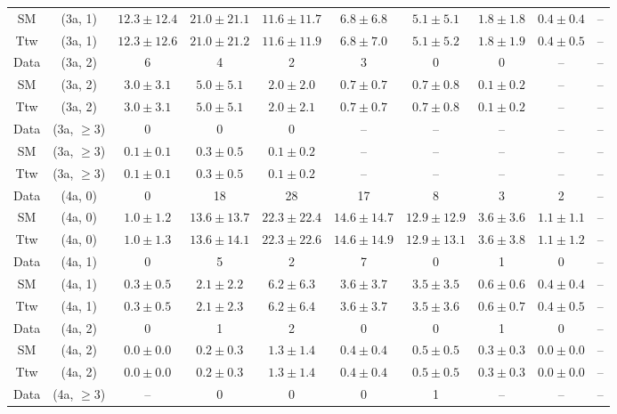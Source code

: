 \begin{table}[h!]
{\begin{tabular}{cccccccccc}
	SM & (3a, 1) & $12.3\pm 12.4$ & $21.0\pm 21.1$ & $11.6\pm 11.7$ & $6.8\pm 6.8$ & $5.1\pm 5.1$ & $1.8\pm 1.8$ & $0.4\pm 0.4$ & -- \\[0.5ex] 
	Ttw & (3a, 1) & $12.3\pm 12.6$ & $21.0\pm 21.2$ & $11.6\pm 11.9$ & $6.8\pm 7.0$ & $5.1\pm 5.2$ & $1.8\pm 1.9$ & $0.4\pm 0.5$ & -- \\[0.5ex] 
	Data & (3a, 2) & 6 & 4 & 2 & 3 & 0 & 0 & -- & -- \\[0.5ex] 
	SM & (3a, 2) & $3.0\pm 3.1$ & $5.0\pm 5.1$ & $2.0\pm 2.0$ & $0.7\pm 0.7$ & $0.7\pm 0.8$ & $0.1\pm 0.2$ & -- & -- \\[0.5ex] 
	Ttw & (3a, 2) & $3.0\pm 3.1$ & $5.0\pm 5.1$ & $2.0\pm 2.1$ & $0.7\pm 0.7$ & $0.7\pm 0.8$ & $0.1\pm 0.2$ & -- & -- \\[0.5ex] 
	Data & (3a, $\ge3$) & 0 & 0 & 0 & -- & -- & -- & -- & -- \\[0.5ex] 
	SM & (3a, $\ge3$) & $0.1\pm 0.1$ & $0.3\pm 0.5$ & $0.1\pm 0.2$ & -- & -- & -- & -- & -- \\[0.5ex] 
	Ttw & (3a, $\ge3$) & $0.1\pm 0.1$ & $0.3\pm 0.5$ & $0.1\pm 0.2$ & -- & -- & -- & -- & -- \\[0.5ex] 
	Data & (4a, 0) & 0 & 18 & 28 & 17 & 8 & 3 & 2 & -- \\[0.5ex] 
	SM & (4a, 0) & $1.0\pm 1.2$ & $13.6\pm 13.7$ & $22.3\pm 22.4$ & $14.6\pm 14.7$ & $12.9\pm 12.9$ & $3.6\pm 3.6$ & $1.1\pm 1.1$ & -- \\[0.5ex] 
	Ttw & (4a, 0) & $1.0\pm 1.3$ & $13.6\pm 14.1$ & $22.3\pm 22.6$ & $14.6\pm 14.9$ & $12.9\pm 13.1$ & $3.6\pm 3.8$ & $1.1\pm 1.2$ & -- \\[0.5ex] 
	Data & (4a, 1) & 0 & 5 & 2 & 7 & 0 & 1 & 0 & -- \\[0.5ex] 
	SM & (4a, 1) & $0.3\pm 0.5$ & $2.1\pm 2.2$ & $6.2\pm 6.3$ & $3.6\pm 3.7$ & $3.5\pm 3.5$ & $0.6\pm 0.6$ & $0.4\pm 0.4$ & -- \\[0.5ex] 
	Ttw & (4a, 1) & $0.3\pm 0.5$ & $2.1\pm 2.3$ & $6.2\pm 6.4$ & $3.6\pm 3.7$ & $3.5\pm 3.6$ & $0.6\pm 0.7$ & $0.4\pm 0.5$ & -- \\[0.5ex] 
	Data & (4a, 2) & 0 & 1 & 2 & 0 & 0 & 1 & 0 & -- \\[0.5ex] 
	SM & (4a, 2) & $0.0\pm 0.0$ & $0.2\pm 0.3$ & $1.3\pm 1.4$ & $0.4\pm 0.4$ & $0.5\pm 0.5$ & $0.3\pm 0.3$ & $0.0\pm 0.0$ & -- \\[0.5ex] 
	Ttw & (4a, 2) & $0.0\pm 0.0$ & $0.2\pm 0.3$ & $1.3\pm 1.4$ & $0.4\pm 0.4$ & $0.5\pm 0.5$ & $0.3\pm 0.3$ & $0.0\pm 0.0$ & -- \\[0.5ex] 
	Data & (4a, $\ge3$) & -- & 0 & 0 & 0 & 1 & -- & -- & -- \\[0.5ex] 

\end{tabular}}
\end{table}
